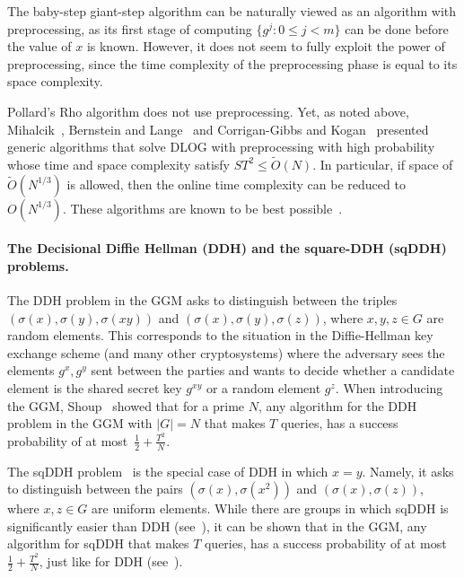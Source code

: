 \documentclass[11pt]{article}
\begin{document}
The baby-step giant-step algorithm can be naturally viewed as an algorithm with preprocessing, as its first stage of computing $\{g^j:0 \leq j < m\}$ can be done before the value of $x$ is known. However, it does not seem to fully exploit the power of preprocessing, since the time complexity of the preprocessing phase %
is equal to its space complexity.

Pollard's Rho algorithm does not use preprocessing. Yet, as noted above, 
Mihalcik~\cite{Mih10}, Bernstein and Lange~\cite{BernsteinL13} and Corrigan-Gibbs and Kogan~\cite{Corrigan-GibbsK18} presented generic algorithms that solve DLOG with preprocessing with high probability whose time and space complexity satisfy $ST^2 \leq \tilde{O}(N)$. In particular, if space of $\tilde{O}(N^{1/3})$ is allowed, then the online time complexity can be reduced to $O(N^{1/3})$. These algorithms are known to be best possible~\cite{Corrigan-GibbsK18}. 

\paragraph{The Decisional Diffie Hellman (DDH) and the square-DDH (sqDDH) problems.} The DDH problem in the GGM asks to distinguish between the triples $(\sigma(x),\sigma(y),\sigma(xy))$ and $(\sigma(x),\sigma(y),\sigma(z))$, where $x,y,z \in G$ are random elements. This corresponds to the situation in the Diffie-Hellman key exchange scheme (and many other cryptosystems) where the adversary sees the elements $g^x,g^y$ sent between the parties and wants to decide whether a candidate element is the shared secret key $g^{xy}$ or a random element $g^z$. When introducing the GGM, Shoup~\cite{Shoup97} showed that for a prime $N$, any algorithm for the DDH problem in the GGM with $|G|=N$ that makes $T$ queries, has a success probability of at most~$\frac{1}{2} +\frac{T^2}{N}$. 


The sqDDH problem~\cite{MaurerW99} is the special case of DDH in which $x=y$. Namely, it asks to distinguish between the pairs $(\sigma(x),\sigma(x^2))$ and $(\sigma(x),\sigma(z))$, where $x,z \in G$ are uniform elements. While there are groups in which sqDDH is significantly easier than DDH (see~\cite{JouxN03}), it can be shown that in the GGM, any algorithm for sqDDH that makes $T$ queries, has a success probability of at most $\frac{1}{2} +\frac{T^2}{N}$, just like for DDH (see~\cite{CorettiDG18}).
\end{document}

